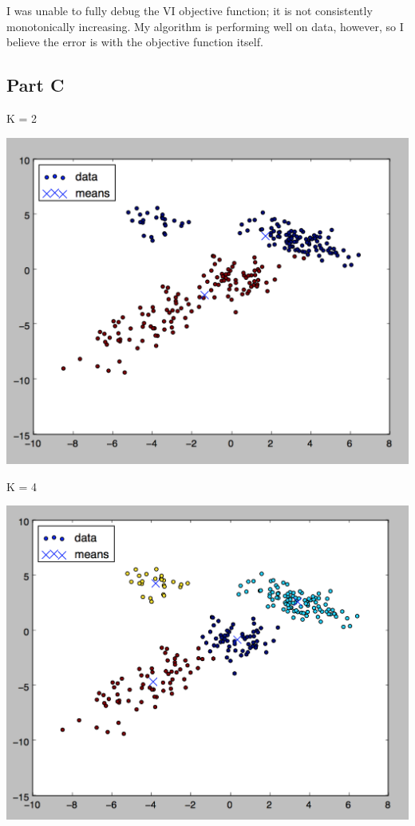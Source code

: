 \documentclass[twoside,11pt]{homework}
\begin{document}
I was unable to fully debug the VI objective function; it is not consistently monotonically increasing. My algorithm is performing well on data, however, so I believe the error is with the objective function itself.

\subsection*{Part C}

K = 2

\includegraphics[scale=.5]{images/vi_2_plot.png}

K = 4

\includegraphics[scale=.5]{images/vi_4_plot.png}
\end{document}
